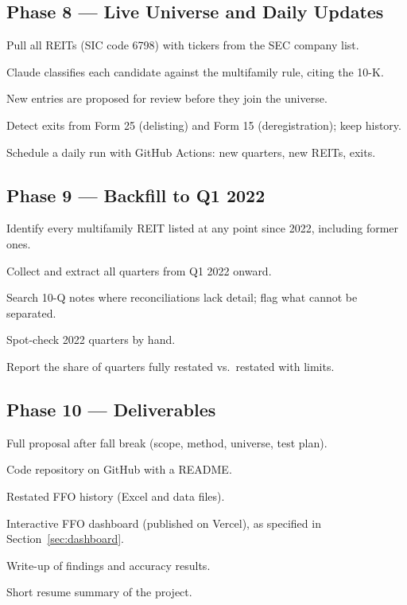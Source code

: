 \documentclass[11pt]{article}
\begin{document}
\subsection{Phase 8 --- Live Universe and Daily Updates}
\begin{todo}
  \item Pull all REITs (SIC code 6798) with tickers from the SEC company list.
  \item Claude classifies each candidate against the multifamily rule, citing the 10-K.
  \item New entries are proposed for review before they join the universe.
  \item Detect exits from Form 25 (delisting) and Form 15 (deregistration); keep history.
  \item Schedule a daily run with GitHub Actions: new quarters, new REITs, exits.
\end{todo}

\subsection{Phase 9 --- Backfill to Q1 2022}
\begin{todo}
  \item Identify every multifamily REIT listed at any point since 2022, including former ones.
  \item Collect and extract all quarters from Q1 2022 onward.
  \item Search 10-Q notes where reconciliations lack detail; flag what cannot be separated.
  \item Spot-check 2022 quarters by hand.
  \item Report the share of quarters fully restated vs.\ restated with limits.
\end{todo}

\subsection{Phase 10 --- Deliverables}
\begin{todo}
  \item Full proposal after fall break (scope, method, universe, test plan).
  \item Code repository on GitHub with a README.
  \item Restated FFO history (Excel and data files).
  \item Interactive FFO dashboard (published on Vercel), as specified in Section~\ref{sec:dashboard}.
  \item Write-up of findings and accuracy results.
  \item Short resume summary of the project.
\end{todo}
\end{document}
